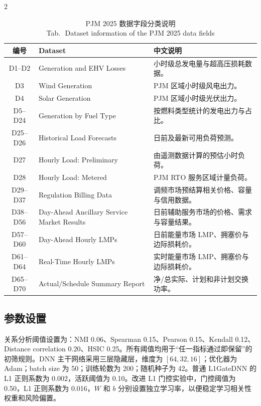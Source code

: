 \documentclass[UTF8,zihao=5,twoside]{ctexart}
\numberwithin{equation}{section}
\newcommand{\tabbicaption}[2]{%
  \caption{#1\\[-0.2em]\small Tab.\,\thetable\ #2}
}
\begin{document}
\begin{multicols}{2}
\begin{table}[H]
\centering
\scriptsize
\setlength{\tabcolsep}{2pt}
\tabbicaption{PJM 2025 数据字段分类说明}{Dataset information of the PJM 2025 data fields}
\label{tab:data_overview}
\begin{tabularx}{\columnwidth}{c>{\raggedright\arraybackslash}p{}X}
\toprule
编号 & Dataset & 中文说明 \\
\midrule
D1--D2 & Generation and EHV Losses & 小时级总发电量与超高压损耗数据。 \\
D3 & Wind Generation & PJM 区域小时级风电出力。 \\
D4 & Solar Generation & PJM 区域小时级光伏出力。 \\
D5--D24 & Generation by Fuel Type & 按燃料类型统计的发电出力与占比。 \\
D25--D26 & Historical Load Forecasts & 日前及最新可用负荷预测。 \\
D27 & Hourly Load: Preliminary & 由遥测数据计算的预估小时负荷。 \\
D28 & Hourly Load: Metered & PJM RTO 服务区域计量负荷。 \\
D29--D37 & Regulation Billing Data & 调频市场预结算相关价格、容量与信用数据。 \\
D38--D56 & Day-Ahead Ancillary Service Market Results & 日前辅助服务市场的价格、需求与容量结果。 \\
D57--D60 & Day-Ahead Hourly LMPs & 日前能量市场 LMP、拥塞价与边际损耗价。 \\
D61--D64 & Real-Time Hourly LMPs & 实时能量市场 LMP、拥塞价与边际损耗价。 \\
D65--D70 & Actual/Schedule Summary Report & 净/总实际、计划和非计划交换功率。 \\
\bottomrule
\end{tabularx}
\end{table}

\subsection{参数设置}
关系分析阈值设置为：NMI 0.06、Spearman 0.15、Pearson 0.15、Kendall 0.12、Distance correlation 0.20、HSIC 0.25。所有阈值均用于“任一指标通过即保留”的初筛规则。DNN 主干网络采用三层隐藏层，维度为 $[64,32,16]$；优化器为 Adam；batch size 为 50；训练轮数为 200；随机种子为 42。普通 L1GateDNN 的 L1 正则系数为 0.002，活跃阈值为 0.10。改进 L1 门控实验中，门控阈值为 0.50，L1 正则系数为 0.016，$W$ 和 $b$ 分别设置独立学习率，以便稳定学习相关性权重和风险偏置。


\end{multicols}
\end{document}
